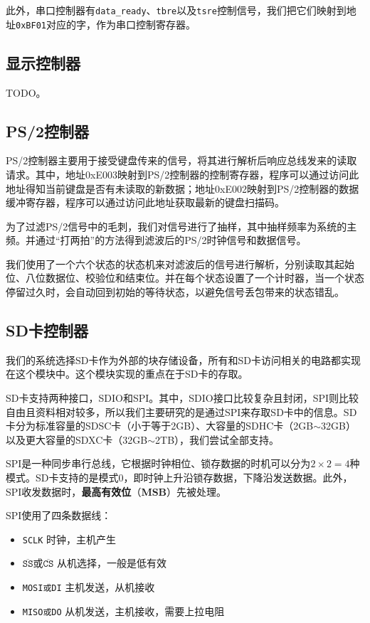\documentclass[11pt,utf8]{report}
\begin{document}
	\par 此外，串口控制器有\texttt{data_ready}、\texttt{tbre}以及\texttt{tsre}控制信号，我们把它们映射到地址\texttt{0xBF01}对应的字，作为串口控制寄存器。

\subsection{显示控制器}
	\par TODO。

\subsection{PS/2控制器}
	PS/2控制器主要用于接受键盘传来的信号，将其进行解析后响应总线发来的读取请求。其中，地址0xE003映射到PS/2控制器的控制寄存器，程序可以通过访问此地址得知当前键盘是否有未读取的新数据；地址0xE002映射到PS/2控制器的数据缓冲寄存器，程序可以通过访问此地址获取最新的键盘扫描码。

	为了过滤PS/2信号中的毛刺，我们对信号进行了抽样，其中抽样频率为系统的主频。并通过“打两拍”的方法得到滤波后的PS/2时钟信号和数据信号。

	我们使用了一个六个状态的状态机来对滤波后的信号进行解析，分别读取其起始位、八位数据位、校验位和结束位。并在每个状态设置了一个计时器，当一个状态停留过久时，会自动回到初始的等待状态，以避免信号丢包带来的状态错乱。


\subsection{SD卡控制器}
	\par 我们的系统选择SD卡作为外部的块存储设备，所有和SD卡访问相关的电路都实现在这个模块中。这个模块实现的重点在于SD卡的存取。
	
	\par SD卡支持两种接口，SDIO和SPI。其中，SDIO接口比较复杂且封闭，SPI则比较自由且资料相对较多，所以我们主要研究的是通过SPI来存取SD卡中的信息。SD卡分为标准容量的SDSC卡（小于等于2GB）、大容量的SDHC卡（2GB$\sim$32GB）以及更大容量的SDXC卡（32GB$\sim$2TB），我们尝试全部支持。
	
	\par SPI是一种同步串行总线，它根据时钟相位、锁存数据的时机可以分为$2 \times 2=4$种模式。SD卡支持的是模式0，即时钟上升沿锁存数据，下降沿发送数据。此外，SPI收发数据时，\textbf{最高有效位}（\textbf{MSB}）先被处理。
	\par SPI使用了四条数据线：
	\begin{itemize}
		\item \texttt{SCLK} 时钟，主机产生
		\item \texttt{$\mathtt{\overline{SS}}\mbox{或}\mathtt{\overline{CS}}$} 从机选择，一般是低有效
		\item \texttt{MOSI或DI} 主机发送，从机接收
		\item \texttt{MISO或DO} 从机发送，主机接收，需要上拉电阻
	\end{itemize}
	
\end{document}
